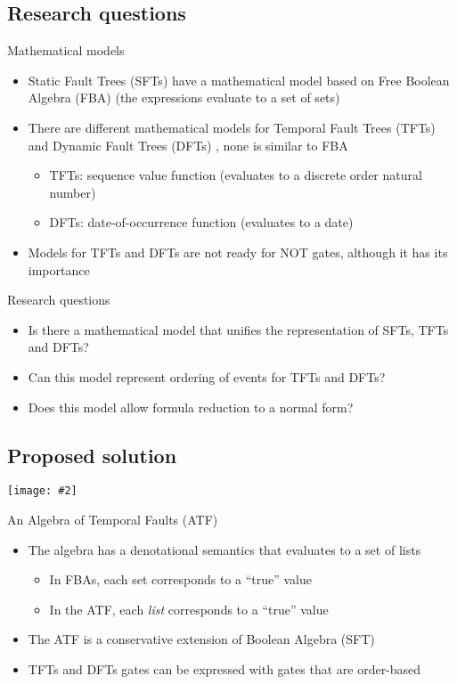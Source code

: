 \documentclass{beamer}
\def\SFT{%
	Static Fault Tree (SFT)%
	\gdef\SFT{SFT\xspace}%
	\gdef\SFTs{SFTs\xspace}%
	\xspace%
}
\def\SFTs{%
	Static Fault Trees (SFTs)%
	\gdef\SFT{SFT\xspace}%
	\gdef\SFTs{SFTs\xspace}%
	\xspace%
}
\def\TFT{%
	Temporal Fault Tree (TFT)%
	\gdef\TFT{TFT\xspace}%
	\gdef\TFTs{TFTs\xspace}%
	\xspace%
}
\def\TFTs{%
	Temporal Fault Trees (TFTs)%
	\gdef\TFT{TFT\xspace}%
	\gdef\TFTs{TFTs\xspace}%
	\xspace%
}
\def\DFT{%
	Dynamic Fault Tree (DFT)%
	\gdef\DFT{DFT\xspace}%
	\gdef\DFTs{DFTs\xspace}%
	\xspace%
}
\def\DFTs{%
	Dynamic Fault Trees (DFTs)%
	\gdef\DFT{DFT\xspace}%
	\gdef\DFTs{DFTs\xspace}%
	\xspace%
}
\def\FBA{%
	Free Boolean Algebra (FBA)%
	\gdef\FBA{FBA\xspace}%
	\gdef\FBAs{FBAs\xspace}%
	\gdef\iFBA{an FBA\xspace}%
	\xspace%
}
\def\FBAs{%
	Free Boolean Algebras (FBAs)%
	\gdef\FBA{FBA\xspace}%
	\gdef\FBAs{FBAs\xspace}%
	\gdef\iFBA{an FBA\xspace}%
	\xspace%
}
\def\iFBA{%
	a Free Boolean Algebra (FBA)%
	\gdef\FBA{FBA\xspace}%
	\gdef\FBAs{FBAs\xspace}%
	\gdef\iFBA{an FBA\xspace}%
	\xspace%
}
\def\ATF{%
	Algebra of Temporal Faults (ATF)%
	\gdef\ATF{ATF\xspace}%
	\gdef\iATF{an ATF\xspace}%
	\gdef\IATF{An ATF\xspace}%
	\xspace%
}
\def\IlATF{%
	An Algebra of Temporal Faults (ATF)%
	\gdef\ATF{ATF\xspace}%
	\gdef\iATF{an ATF\xspace}%
	\gdef\IATF{An ATF\xspace}%
	\xspace%
}
\def\iATF{%
	an Algebra of Temporal Faults (ATF)%
	\gdef\ATF{ATF\xspace}%
	\gdef\iATF{an ATF\xspace}%
	\gdef\IATF{An ATF\xspace}%
	\xspace%
}
\def\IATF{%
	An Algebra of Temporal Faults (ATF)%
	\gdef\ATF{ATF\xspace}%
	\gdef\iATF{an ATF\xspace}%
	\gdef\IATF{An ATF\xspace}%
	\xspace%
}
\newcommand{\includegraphicsaspectratio}[2][1]{%
  \texttt{[image: \#2]}%
}
\begin{document}
\subsection{Research questions}

\begin{frame}{Mathematical models}
	\begin{itemize}
		\item \SFTs have a mathematical model based on \FBA (the expressions evaluate to a set of sets)
		\item There are different mathematical models for \TFTs and \DFTs, none is similar to \FBA
		\begin{itemize}
			\item \TFTs: sequence value function (evaluates to a discrete order natural number)
			\item \DFTs: date-of-occurrence function (evaluates to a date)
		\end{itemize}
		\item Models for \TFTs and \DFTs are not ready for NOT gates, although it has its importance
	\end{itemize}
\end{frame}

\begin{frame}{Research questions}
	\begin{itemize}
		\item Is there a mathematical model that unifies the representation of \SFTs, \TFTs and \DFTs?
		\item Can this model represent ordering of events for \TFTs and \DFTs? 
		\item Does this model allow formula reduction to a normal form?
	\end{itemize}
\end{frame}

\subsection{Proposed solution}
\begin{frame}
	\begin{center}
		\includegraphicsaspectratio[1]{StrategyOverview}
	\end{center}
\end{frame}

\begin{frame}{\IlATF}
	\begin{itemize}
		\item The algebra has a denotational semantics that evaluates to a set of lists
		\begin{itemize}
			\item In \FBAs, each set corresponds to a ``true'' value
			\item In the \ATF, each \emph{list} corresponds to a ``true'' value
		\end{itemize}
		\item The \ATF is a conservative extension of Boolean Algebra (\SFT)
		\item \TFTs and \DFTs gates can be expressed with gates that are order-based
	\end{itemize}
\end{frame}
\end{document}
